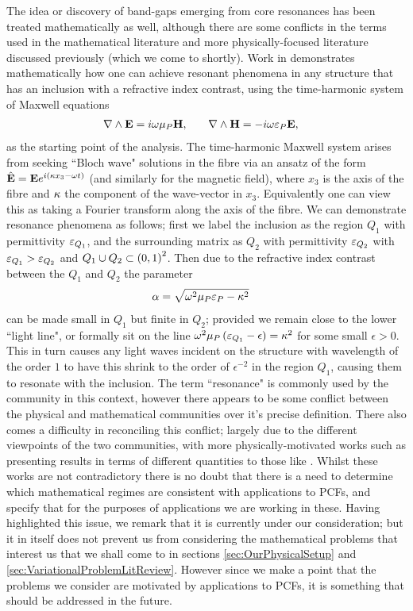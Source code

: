 The idea or discovery of band-gaps emerging from core resonances has been treated mathematically as well, although there are some conflicts in the terms used in the mathematical literature and more physically-focused literature discussed previously (which we come to shortly).
Work in \cite{cooper2014band} demonstrates mathematically how one can achieve resonant phenomena in any structure that has an inclusion with a refractive index contrast, using the time-harmonic system of Maxwell equations
\begin{align*}
	\nabla\wedge\mathbf{E} &= i\omega\mu_{P}\mathbf{H}, &\quad \nabla\wedge\mathbf{H} &= -i\omega\varepsilon_{P}\mathbf{E},
\end{align*}
as the starting point of the analysis.
The time-harmonic Maxwell system arises from seeking ``Bloch wave" solutions in the fibre via an ansatz of the form $\hat{\mathbf{E}}=\mathbf{E}e^{i\left( \kappa x_3-\omega t \right)}$ (and similarly for the magnetic field), where $x_3$ is the axis of the fibre and $\kappa$ the component of the wave-vector in $x_3$.
Equivalently one can view this as taking a Fourier transform along the axis of the fibre.
We can demonstrate resonance phenomena as follows; first we label the inclusion as the region $Q_1$ with permittivity $\varepsilon_{Q_1}$, and the surrounding matrix as $Q_2$ with permittivity $\varepsilon_{Q_2}$ with $\varepsilon_{Q_1}>\varepsilon_{Q_2}$ and $Q_1\cup Q_2\subset\left( 0,1 \right)^2$.
Then due to the refractive index contrast between the $Q_1$ and $Q_2$ the parameter
\begin{align*}
	\alpha &= \sqrt{\omega^2\mu_{P}\varepsilon_{P} - \kappa^2}
\end{align*}
can be made small in $Q_1$ but finite in $Q_2$; provided we remain close to the lower ``light line", or formally sit on the line $\omega^2\mu_{P}\left( \varepsilon_{Q_1}-\epsilon \right) = \kappa^2$ for some small $\epsilon>0$.
This in turn causes any light waves incident on the structure with wavelength of the order $1$ to have this shrink to the order of $\epsilon^{-2}$ in the region $Q_1$, causing them to resonate with the inclusion.
The term ``resonance" is commonly used by the community in this context, however there appears to be some conflict between the physical and mathematical communities over it's precise definition.
There also comes a difficulty in reconciling this conflict; largely due to the different viewpoints of the two communities, with more physically-motivated works such as \cite{birks2004scaling} presenting results in terms of different quantities to those like \cite{cooper2014band}.
Whilst these works are not contradictory there is no doubt that there is a need to determine which mathematical regimes are consistent with applications to PCFs, and specify that for the purposes of applications we are working in these.
Having highlighted this issue, we remark that it is currently under our consideration; but it in itself does not prevent us from considering the mathematical problems that interest us that we shall come to in sections \ref{sec:OurPhysicalSetup} and \ref{sec:VariationalProblemLitReview}.
However since we make a point that the problems we consider are motivated by applications to PCFs, it is something that should be addressed in the future.

